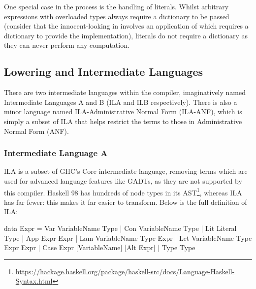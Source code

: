 \documentclass[dissertation.tex]{subfiles}
\begin{document}
{{{            One special case in the process is the handling of literals. Whilst arbitrary expressions with overloaded
            types always require a dictionary to be passed (consider that the innocent-looking  in
             involves an application of \haskell{+} which requires a dictionary to provide
            the implementation), literals do not require a dictionary as they can never perform any computation.

        }
    }
    \subsection{Lowering and Intermediate Languages}
    {

        There are two intermediate languages within the compiler, imaginatively named Intermediate Languages A and B
        (ILA and ILB respectively). There is also a minor language named ILA-Administrative Normal Form (ILA-ANF), which
        is simply a subset of ILA that helps restrict the terms to those in Administrative Normal Form (ANF).


        \subsubsection{Intermediate Language A}
        {

            ILA is a subset of GHC's Core intermediate language, removing terms which are used for advanced language
            features like GADTs, as they are not supported by this compiler. Haskell 98 has hundreds of node types in
            its
            AST\footnote{\url{https://hackage.haskell.org/package/haskell-src/docs/Language-Haskell-Syntax.html}}, whereas ILA has far fewer: this makes it far easier to transform. Below is the
            full definition of ILA:

            \begin{haskellfigure}
            data Expr = Var VariableName Type
                      | Con VariableName Type
                      | Lit Literal Type
                      | App Expr Expr
                      | Lam VariableName Type Expr
                      | Let VariableName Type Expr Expr
                      | Case Expr [VariableName] [Alt Expr]
                      | Type Type


\end{haskellfigure}}}}
\end{document}
